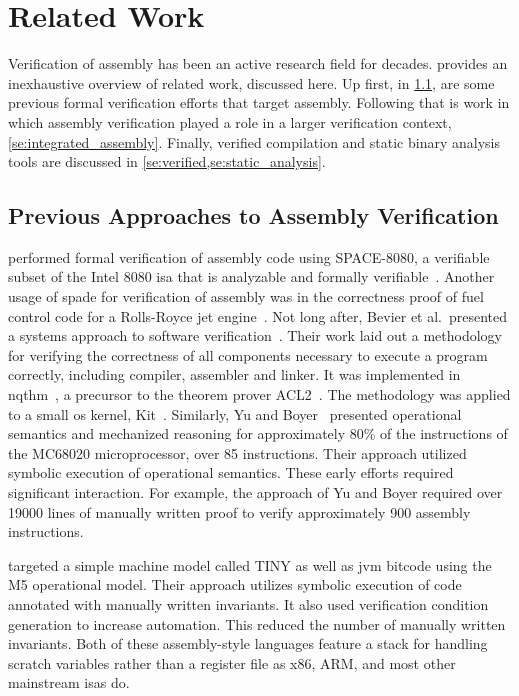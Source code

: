 \chapter{Related Work}
Verification of assembly has been an active research field for decades.
 provides an inexhaustive overview of related work,
discussed here.
Up first, in \cref{se:previous_assembly},
are some previous formal verification efforts that target assembly.
Following that is work in which assembly verification played a role
in a larger verification context, \cref{se:integrated_assembly}.
Finally, verified compilation and static binary analysis tools are discussed
in \cref{se:verified,se:static_analysis}.

\section{Previous Approaches to Assembly Verification}\label{se:previous_assembly}
\citet{clutterbuck1988verification} performed formal verification
of assembly code using SPACE-8080, a verifiable subset of the Intel 8080
\ac{isa} that is analyzable and formally verifiable~\citep{carre1986spade}.
Another usage of \ac{spade} for verification of assembly
was in the correctness proof of fuel control code for a Rolls-Royce
jet engine~\citet{oneill1988verification}.
Not long after, Bevier et al.\ presented a systems approach
to software verification~\citep{bevier1989approach,boyer1979computational}.
Their work laid out a methodology for verifying the correctness
of all components necessary to execute a program correctly,
including compiler, assembler and linker.
It was implemented in \ac{nqthm}~\citep{boyer1979computational},
a precursor to the theorem prover ACL2~\citep{ACL2}.
The methodology was applied to a small \ac{os} kernel, Kit~\citep{bevier1989kit}.
Similarly, Yu and Boyer~\citep{yu1992automated,boyer1996automated}
presented operational semantics and mechanized reasoning
for approximately 80\% of the instructions of the MC68020 microprocessor,
over 85 instructions.
Their approach utilized symbolic execution of operational semantics.
These early efforts required significant interaction.
For example, the approach of Yu and Boyer required over \num{19000}
lines of manually written proof to verify approximately \num{900} assembly instructions.

\citet{matthews2006verification} targeted a simple machine model called TINY
as well as \ac{jvm} bitcode using the M5 operational model.
Their approach utilizes symbolic execution of code annotated
with manually written invariants.
It also used verification condition generation to increase automation.
This reduced the number of manually written invariants.
Both of these assembly-style languages feature a stack
for handling scratch variables rather than a register file
as x86, ARM, and most other mainstream \acp{isa} do.

